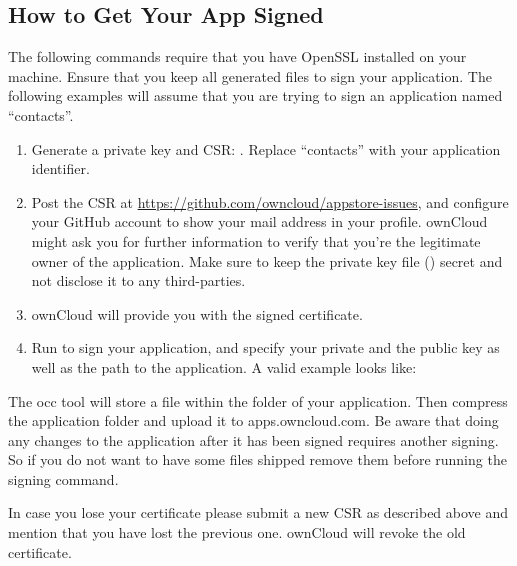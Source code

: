 \documentclass[letterpaper,10pt,english]{sphinxmanual}
\begin{document}
\subsection{How to Get Your App Signed}
\label{app/code_signing:how-to-get-your-app-signed}
The following commands require that you have OpenSSL installed on your machine.
Ensure that you keep all generated files to sign your application. The following
examples will assume that you are trying to sign an application named
``contacts''.
\begin{enumerate}
\item {} 
Generate a private key and CSR: . Replace ``contacts'' with your application identifier.

\item {} 
Post the CSR at \href{https://github.com/owncloud/appstore-issues}{https://github.com/owncloud/appstore-issues}, and configure
your GitHub account to show your mail address in your profile. ownCloud
might ask you for further information to verify that you're the legitimate
owner of the application. Make sure to keep the private key file ()
secret and not disclose it to any third-parties.

\item {} 
ownCloud will provide you with the signed certificate.

\item {} 
Run  to sign your application, and specify
your private and the public key as well as the path to the application.
A valid example looks like: 

\end{enumerate}

The occ tool will store a  file within the  folder
of your application. Then compress the application folder and upload it to
apps.owncloud.com. Be aware that doing any changes to the application after it
has been signed requires another signing. So if you do not want to have some
files shipped remove them before running the signing command.

In case you lose your certificate please submit a new CSR as described above and
mention that you have lost the previous one. ownCloud will revoke the old
certificate.
\end{document}

